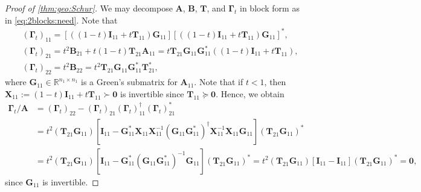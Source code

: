 \documentclass[noinfoline]{imsart}\setcounter{tocdepth}{2}
\renewcommand{\b}[1]{\mathbb{#1}} %
\newcommand{\m}[1]{\mathbf{#1}} %
\theoremstyle{plain}
\begin{document}
\begin{proof}[Proof of \cref{thm:geo:Schur}]
We may decompose $\m{A}$, $\m{B}$, $\m{T}$, and $\m{\Gamma}_{t}$ in block form as in \eqref{eq:2blocks:need}. Note that
\begin{align*}
    &(\m{\Gamma}_{t})_{11} = [((1-t) \m{I}_{11} + t \m{T}_{11}) \m{G}_{11}] [((1-t) \m{I}_{11} + t \m{T}_{11}) \m{G}_{11}]^{*}, \\
    &(\m{\Gamma}_{t})_{21} = t^{2} \m{B}_{21} + t(1-t) \m{T}_{21} \m{A}_{11} = t \m{T}_{21} \m{G}_{11} \m{G}_{11}^{*} ((1-t) \m{I}_{11} + t \m{T}_{11}), \\
    &(\m{\Gamma}_{t})_{22} = t^{2} \m{B}_{22} = t^{2} \m{T}_{21} \m{G}_{11} \m{G}_{11}^{*} \m{T}_{21}^{*},
\end{align*}
where $\m{G}_{11} \in \b{R}^{n_{1} \times n_{1}}$ is a Green's submatrix for $\m{A}_{11}$. 
Note that if $t < 1$, then $\m{X}_{11} := (1-t) \m{I}_{11} + t \m{T}_{11} \succ \m{0}$ is invertible since $\m{T}_{11} \succeq \m{0}$. Hence, we obtain
\begin{align*}
    \m{\Gamma}_{t}/\m{A} &= (\m{\Gamma}_{t})_{22} - (\m{\Gamma}_{t})_{21} (\m{\Gamma}_{t})_{11}^{\dagger} (\m{\Gamma}_{t})_{21}^{*} \\
    &= t^{2} (\m{T}_{21} \m{G}_{11}) \left[ \m{I}_{11} - \m{G}_{11}^{*} \m{X}_{11} \m{X}_{11}^{-1} (\m{G}_{11} \m{G}_{11}^{*})^{\dagger} \m{X}_{11}^{-1} \m{X}_{11} \m{G}_{11} \right] (\m{T}_{21} \m{G}_{11})^{*} \\
    &= t^{2} (\m{T}_{21} \m{G}_{11}) \left[ \m{I}_{11} - \m{G}_{11}^{*} (\m{G}_{11} \m{G}_{11}^{*})^{-1} \m{G}_{11} \right] (\m{T}_{21} \m{G}_{11})^{*} 
    = t^{2} (\m{T}_{21} \m{G}_{11}) \left[ \m{I}_{11} - \m{I}_{11} \right] (\m{T}_{21} \m{G}_{11})^{*} = \m{0},
\end{align*}
since $\m{G}_{11}$ is invertible.

\end{proof}
\end{document}
